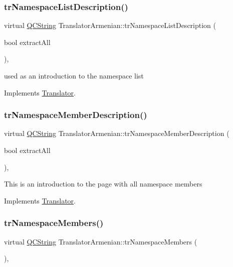 \subsubsection{\texorpdfstring{trNamespaceListDescription()}{trNamespaceListDescription()}}
{\footnotesize\ttfamily virtual \mbox{\hyperlink{class_q_c_string}{Q\+C\+String}} Translator\+Armenian\+::tr\+Namespace\+List\+Description (\begin{DoxyParamCaption}\item[{bool}]{extract\+All }\end{DoxyParamCaption})\hspace{0.3cm}{\ttfamily [inline]}, {\ttfamily [virtual]}}

used as an introduction to the namespace list 

Implements \mbox{\hyperlink{class_translator}{Translator}}.

\mbox{\label{class_translator_armenian_a83e439c222cd85ad53de1276c4f318ed}} 
\subsubsection{\texorpdfstring{trNamespaceMemberDescription()}{trNamespaceMemberDescription()}}
{\footnotesize\ttfamily virtual \mbox{\hyperlink{class_q_c_string}{Q\+C\+String}} Translator\+Armenian\+::tr\+Namespace\+Member\+Description (\begin{DoxyParamCaption}\item[{bool}]{extract\+All }\end{DoxyParamCaption})\hspace{0.3cm}{\ttfamily [inline]}, {\ttfamily [virtual]}}

This is an introduction to the page with all namespace members 

Implements \mbox{\hyperlink{class_translator}{Translator}}.

\mbox{\label{class_translator_armenian_a04c520024834883c7ffb5f121f91f88a}} 
\subsubsection{\texorpdfstring{trNamespaceMembers()}{trNamespaceMembers()}}
{\footnotesize\ttfamily virtual \mbox{\hyperlink{class_q_c_string}{Q\+C\+String}} Translator\+Armenian\+::tr\+Namespace\+Members (\begin{DoxyParamCaption}{ }\end{DoxyParamCaption})\hspace{0.3cm}{\ttfamily [inline]}, {\ttfamily [virtual]}}

